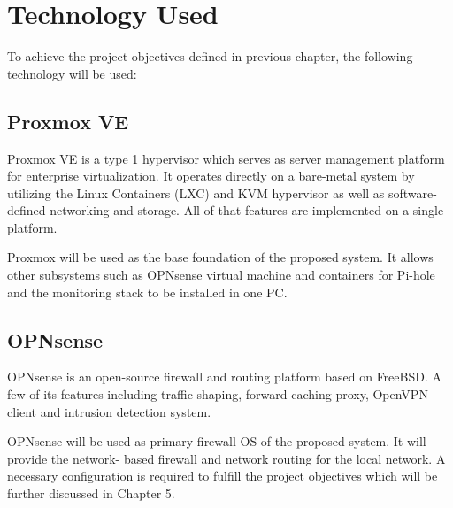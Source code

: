 \documentclass[../index.tex]{subfiles}
\begin{document}
\section{Technology Used}

To achieve the project objectives defined in previous chapter, the following technology will be
used:

\subsection{Proxmox VE}

Proxmox VE is a type 1 hypervisor which serves as server management platform for enterprise
virtualization. It operates directly on a bare-metal system by utilizing the Linux Containers (LXC)
and KVM hypervisor as well as software-defined networking and storage. All of that features are
implemented on a single platform.

Proxmox will be used as the base foundation of the proposed system. It allows other subsystems such
as OPNsense virtual machine and containers for Pi-hole and the monitoring stack to be installed in
one PC.

\subsection{OPNsense}

OPNsense is an open-source firewall and routing platform based on FreeBSD. A few of its features
including traffic shaping, forward caching proxy, OpenVPN client and intrusion detection system.

OPNsense will be used as primary firewall OS of the proposed system. It will provide the network-
based firewall and network routing for the local network. A necessary configuration is required to
fulfill the project objectives which will be further discussed in Chapter 5.

%
%
%
\end{document}
